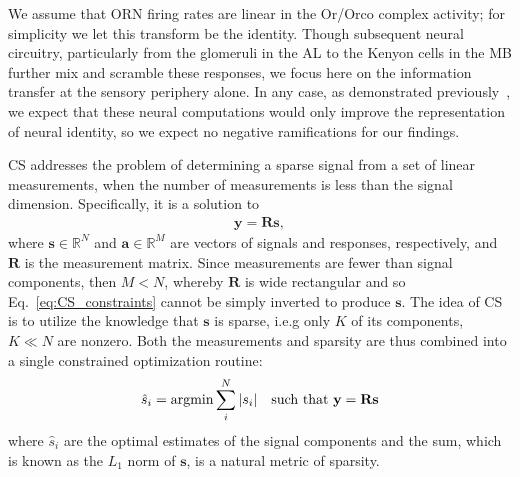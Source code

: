 \documentclass[letterpaper,12pt]{article}
\begin{document}
	We assume that ORN firing rates are linear in the Or/Orco complex activity; for simplicity we let this transform be the identity. Though subsequent neural circuitry, particularly from the glomeruli in the AL to the Kenyon cells in the MB further mix and scramble these responses, we focus here on the information transfer at the sensory periphery alone. In any case, as demonstrated previously~\cite{vijay_1}, we expect that these neural computations would only improve the representation of neural identity, so we expect no negative ramifications for our findings.
	
	CS addresses the problem of determining a sparse signal from a set of linear measurements, when the number of measurements is less than the signal dimension. Specifically, it is a solution to 
	\begin{align}
	\mathbf y = \mathbf R\mathbf s,
	\label{eq:CS_constraints}
	\end{align} where $\mathbf s \in \mathbb{R}^N$ and $\mathbf a\in \mathbb{R}^M$ are vectors of signals and responses, respectively, and $\mathbf R$ is the measurement matrix. Since measurements are fewer than signal components, then $M < N$, whereby $\mathbf R$ is wide rectangular and so Eq.~\ref{eq:CS_constraints} cannot be simply inverted to produce $\mathbf s$. The idea of CS is to utilize the knowledge that $\mathbf s$ is sparse, i.e.g only $K$ of its components, $K \ll N$ are nonzero. Both the measurements and sparsity are thus combined into a single constrained optimization routine:
	\begin{align}
	\hat s_i = \textup{argmin} \sum_i^N |s_i| \quad \textup{such that } \mathbf y = \mathbf R\mathbf s
	\label{eq:CS}
	\end{align}
	where $\hat s_i$ are the optimal estimates of the signal components and the sum, which is known as the $L_1$ norm of $\mathbf s$, is a natural metric of sparsity. 
	
\end{document}
